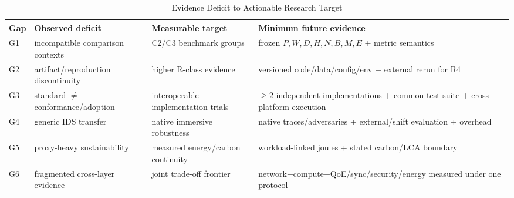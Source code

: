 \begin{table}[H]\centering\caption{Evidence Deficit to Actionable Research Target}\label{tab:agenda}\scriptsize\begin{tabularx}{\columnwidth}{p{}p{}p{}Y}\toprule Gap & Observed deficit & Measurable target & Minimum future evidence\\\midrule G1 & incompatible comparison contexts & C2/C3 benchmark groups & frozen $P,W,D,H,N,B,M,E$ + metric semantics\\ G2 & artifact/reproduction discontinuity & higher R-class evidence & versioned code/data/config/env + external rerun for R4\\ G3 & standard $\neq$ conformance/adoption & interoperable implementation trials & $\geq2$ independent implementations + common test suite + cross-platform execution\\ G4 & generic IDS transfer & native immersive robustness & native traces/adversaries + external/shift evaluation + overhead\\ G5 & proxy-heavy sustainability & measured energy/carbon continuity & workload-linked joules + stated carbon/LCA boundary\\ G6 & fragmented cross-layer evidence & joint trade-off frontier & network+compute+QoE/sync/security/energy measured under one protocol\\\bottomrule\end{tabularx}\end{table}
